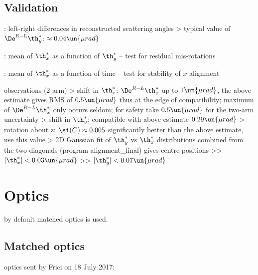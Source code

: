 \subsection[alignment-val]{Validation}

\> : left-right differences in reconstructed scattering angles
\>> typical value of $\De^{\rm R-L}\th^*_y$: $\approx 0.04\un{\mu rad}$

\> : mean of $\th_x^*$ as a function of $\th_y^*$ -- test for residual mis-rotations

\> :  mean of $\th_x^*$ as a function of time -- test for stability of $x$ alignment

\> observations (2 arm)
\>> shift in $\th_x^*$: $\De^{R-L} \th_x^*$ up to $1\un{\mu rad}$, the above estimate gives RMS of $0.5\un{\mu rad}$ thus at the edge of compatibility; maximum of $\De^{R-L} \th_x^*$ only occurs seldom; for safety take $0.5\un{\mu rad}$ for the two-arm uncertainty
\>> shift in $\th_y^*$: compatible with above estimate $0.29\un{\mu rad}$
\>> rotation about z: $\si(C) \approx 0.005$ significantly better than the above estimate, use this value
\>> 2D Gaussian fit of $\th^*_y$ vs $\th^*_x$ distributions combined from the two diagonals (program alignment\_final) gives centre positions
\>>> $|\th^*_x| < 0.03\un{\mu rad}$
\>>> $|\th^*_y| < 0.07\un{\mu rad}$



\section[optics]{Optics}

\> by default matched optics is used.

\subsection[optics-matched]{Matched optics}

\> optics sent by Frici on 18 July 2017:

\centerline{\vbox{}}

